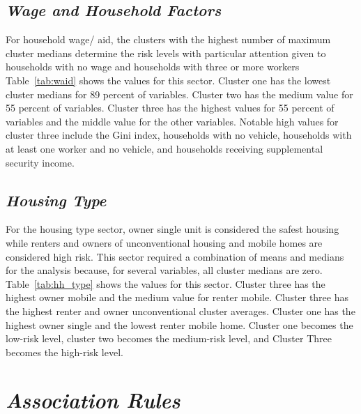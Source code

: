 \subsection{\textit{Wage and Household Factors}}

For household wage/ aid, the clusters with the highest number of maximum cluster medians determine the risk levels with particular attention given to households with no wage and households with three or more workers Table~\ref{tab:waid} shows the values for this sector. Cluster one has the lowest cluster medians for 89 percent of variables. Cluster two has the medium value for 55 percent of variables. Cluster three has the highest values for 55 percent of variables and the middle value for the other variables. Notable high values for cluster three include the Gini index, households with no vehicle, households with at least one worker and no vehicle, and households receiving supplemental security income.  



\subsection{\textit{Housing Type}}
For the housing type sector, owner single unit is considered the safest housing while renters and owners of unconventional housing and mobile homes are considered high risk. This sector required a combination of means and medians for the analysis because, for several variables, all cluster medians are zero. Table~\ref{tab:hh_type} shows the values for this sector. Cluster three has the highest owner mobile and the medium value for renter mobile. Cluster three has the highest renter and owner unconventional cluster averages. Cluster one has the highest owner single and the lowest renter mobile home. Cluster one becomes the low-risk level, cluster two becomes the medium-risk level, and Cluster Three becomes the high-risk level.




\section{\textit{Association Rules}}

